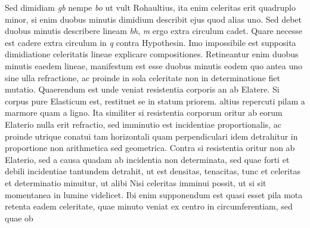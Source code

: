       Sed  dimidiam  \textit{gb} nempe \textit{bo} ut vult Rohaultius\protect{}, ita enim celeritas\protect{} erit quadruplo minor, si enim duobus minutis dimidium describit ejus quod alias uno. Sed debet duobus minutis describere lineam \textit{bh}, \textit{m} ergo extra circulum cadet. Quare necesse est  cadere extra circulum in \textit{q} contra Hypothesin. Imo impossibile est supposita dimidiatione celeritatis\protect{} lineae explicare compositiones. Retineantur enim duobus minutis eaedem lineae, manifestum est  esse duobus minutis eodem quo antea uno sine ulla refractione\protect{}, ac proinde in sola celeritate\protect{} non in determinatione fiet mutatio. Quaerendum est unde veniat resistentia corporis an ab Elatere\protect{}. Si corpus pure Elasticum est, restituet se in statum priorem.  altius repercuti pilam a marmore quam a ligno. Ita similiter si resistentia corporum oritur ab eorum Elaterio\protect{} nulla erit refractio\protect{}, sed imminutio    est incidentiae proportionalis, ac proinde utrique conatui tam horizontali quam perpendiculari idem detrahitur in proportione non arithmetica sed geometrica. Contra si resistentia oritur non ab  Elaterio\protect{}, sed a causa quadam ab incidentia non determinata, sed quae forti et debili incidentiae tantundem detrahit, ut est densitas, tenacitas,  tunc et celeritas\protect{} et determinatio minuitur, ut alibi  Nisi celeritas\protect{} imminui possit, ut si sit momentanea in lumine videlicet. Ibi enim supponendum est quasi esset pila mota retenta eadem celeritate\protect{}, quae minuto veniat ex centro in circumferentiam, sed quae ob 